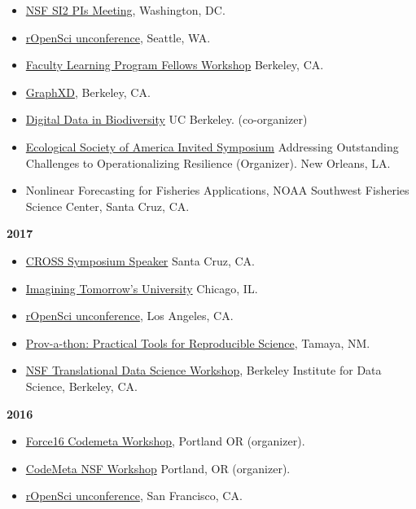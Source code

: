 \documentclass[10pt,sans]{moderncv}        %
\providecommand{\tightlist}{%
    \setlength{\itemsep}{0pt}\setlength{\parskip}{0pt}}
\begin{document}
\begin{itemize}
\tightlist
\item
  \href{https://si2-pi-community.github.io/2018-meeting/}{NSF SI2 PIs
  Meeting}, Washington, DC.
\item
  \href{http://unconf18.ropensci.org}{rOpenSci unconference}, Seattle,
  WA.
\item
  \href{https://teaching.berkeley.edu/programs/transforming-stem-teaching-faculty-learning-program/become-flp-faculty-fellow}{Faculty
  Learning Program Fellows Workshop} Berkeley, CA.
\item
  \href{https://graphxd.github.io/workshop/2018.html}{GraphXD},
  Berkeley, CA.
\item
  \href{https://www.idigbio.org/wiki/index.php/Digital_Data_in_Biodiversity_Research_Conference,_Berkeley}{Digital
  Data in Biodiversity} UC Berkeley. (co-organizer)
\item
  \href{https://eco.confex.com/eco/2018/meetingapp.cgi/Session/14034}{Ecological
  Society of America Invited Symposium} Addressing Outstanding
  Challenges to Operationalizing Resilience (Organizer). New Orleans,
  LA.
\item
  Nonlinear Forecasting for Fisheries Applications, NOAA Southwest
  Fisheries Science Center, Santa Cruz, CA.
\end{itemize}

\textbf{2017}

\begin{itemize}
\tightlist
\item
  \href{https://cross.ucsc.edu/cross-events/research-symposium/2017-symposium/}{CROSS
  Symposium Speaker} Santa Cruz, CA.
\item
  \href{http://www.ncsa.illinois.edu/Conferences/ImagineU/participants.html}{Imagining
  Tomorrow's University} Chicago, IL.
\item
  \href{http://unconf17.ropensci.org}{rOpenSci unconference}, Los
  Angeles, CA.
\item
  \href{https://dataoneorg.github.io/provathon-2017/}{Prov-a-thon:
  Practical Tools for Reproducible Science}, Tamaya, NM.
\item
  \href{https://bids.berkeley.edu/events/translational-data-science-workshop}{NSF
  Translational Data Science Workshop}, Berkeley Institute for Data
  Science, Berkeley, CA.
\end{itemize}

\textbf{2016}

\begin{itemize}
\tightlist
\item
  \href{http://sched.co/5wK5}{Force16 Codemeta Workshop}, Portland OR
  (organizer).
\item
  \href{https://codemeta.github.io}{CodeMeta NSF Workshop} Portland, OR
  (organizer).
\item
  \href{http://unconf16.ropensci.org}{rOpenSci unconference}, San
  Francisco, CA.
\end{itemize}
\end{document}
